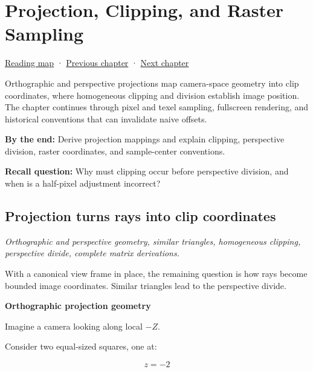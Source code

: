 \chapter{Projection, Clipping, and Raster Sampling}\label{02-foundations-ii-ch033-projection-clipping-and-raster-sampling}\hypertarget{02-foundations-ii-ch033}{}\label{stagechapter:02-foundations-ii-ch033}

\hypertarget{02-foundations-ii-ch033-projection-clipping-and-raster-sampling}{}

\hyperref[volume-reading-map]{Reading map} · \hyperref[02-foundations-ii-ch032-geometry-becomes-an-image-and-an-inverse-problem]{Previous chapter} · \hyperref[02-foundations-ii-ch034-robust-predicates-and-camera-sensitivity]{Next chapter}

Orthographic and perspective projections map camera-space geometry into clip coordinates, where homogeneous clipping and division establish image position. The chapter continues through pixel and texel sampling, fullscreen rendering, and historical conventions that can invalidate naive offsets.

\textbf{By the end:} Derive projection mappings and explain clipping, perspective division, raster coordinates, and sample-center conventions.

\textbf{Recall question:} Why must clipping occur before perspective division, and when is a half-pixel adjustment incorrect?

\section{Projection turns rays into clip coordinates}\label{02-foundations-ii-ch033-projection-turns-rays-into-clip-coordinates}

\hypertarget{02-foundations-ii-ch033-projection-turns-rays-into-clip-coordinates}{}

\emph{Orthographic and perspective geometry, similar triangles, homogeneous clipping, perspective divide, complete matrix derivations.}

With a canonical view frame in place, the remaining question is how rays become bounded image coordinates. Similar triangles lead to the perspective divide.

\textbf{Orthographic projection geometry}

Imagine a camera looking along local \(-Z\).

Consider two equal-sized squares, one at:

\[
 z=-2
\]

